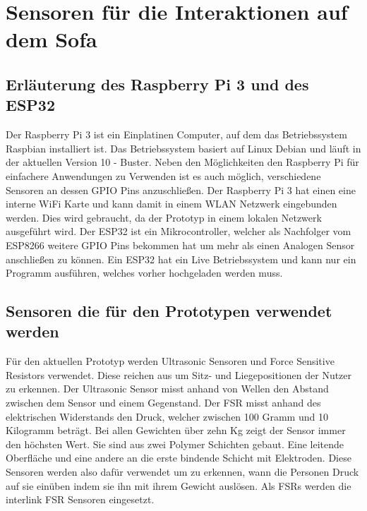 \section{Sensoren für die Interaktionen auf dem Sofa}
\subsection{Erläuterung des Raspberry Pi 3 und des ESP32}
Der Raspberry Pi 3 ist ein Einplatinen Computer, auf dem das Betriebssystem Raspbian installiert ist. Das Betriebssystem basiert auf Linux Debian und läuft in der aktuellen Version 10 - Buster. Neben den Möglichkeiten den Raspberry Pi für einfachere Anwendungen zu Verwenden ist es auch möglich, verschiedene Sensoren an dessen GPIO Pins anzuschließen. Der Raspberry Pi 3 hat einen eine interne WiFi Karte und kann damit in einem WLAN Netzwerk eingebunden werden. Dies wird gebraucht, da der Prototyp in einem lokalen Netzwerk ausgeführt wird.
\newline
Der ESP32 ist ein Mikrocontroller, welcher als Nachfolger vom ESP8266 weitere GPIO Pins bekommen hat um mehr als einen Analogen Sensor anschließen zu können. Ein ESP32 hat ein Live Betriebssystem und kann nur ein Programm ausführen, welches vorher hochgeladen werden muss. 

\subsection{Sensoren die für den Prototypen verwendet werden}
Für den aktuellen Prototyp werden Ultrasonic Sensoren und Force Sensitive Resistors verwendet. 
Diese reichen aus um Sitz- und Liegepositionen der Nutzer zu erkennen. Der Ultrasonic Sensor misst anhand von Wellen den Abstand zwischen dem Sensor und einem Gegenstand.
\newline
Der FSR misst anhand des elektrischen Widerstands den Druck, welcher zwischen 100 Gramm und 10 Kilogramm beträgt. Bei allen Gewichten über zehn Kg zeigt der Sensor immer den höchsten Wert. \citep{florez2010calibration}
Sie sind aus zwei Polymer Schichten gebaut. Eine leitende Oberfläche und eine andere an die erste bindende Schicht mit Elektroden. \citep{hollinger2006evaluation} Diese Sensoren werden also dafür verwendet um zu erkennen, wann die Personen Druck auf sie einüben indem sie ihn mit ihrem Gewicht auslösen. Als FSRs werden die interlink FSR Sensoren eingesetzt.

